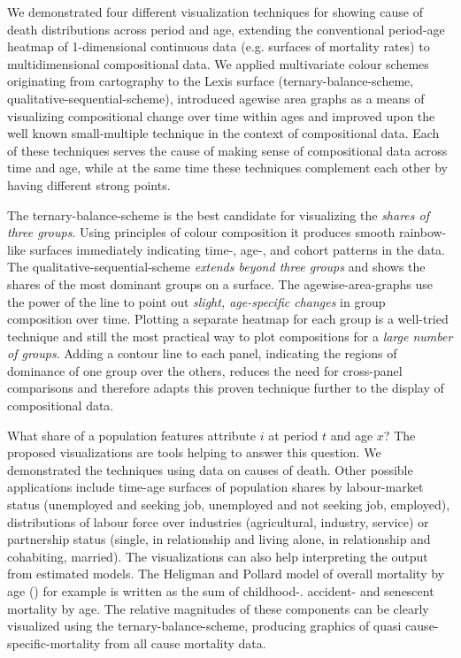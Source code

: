 \documentclass{scrartcl}
\begin{document}
We demonstrated four different visualization techniques for showing cause of death distributions across period and age, extending the conventional period-age heatmap of 1-dimensional continuous data (e.g. surfaces of mortality rates) to multidimensional compositional data. We applied multivariate colour schemes originating from cartography to the Lexis surface (ternary-balance-scheme, qualitative-sequential-scheme), introduced agewise area graphs as a means of visualizing compositional change over time within ages and improved upon the well known small-multiple technique in the context of compositional data. Each of these techniques serves the cause of making sense of compositional data across time and age, while at the same time these techniques complement each other by having different strong points.

The ternary-balance-scheme is the best candidate for visualizing the \emph{shares of three groups}. Using principles of colour composition it produces smooth rainbow-like surfaces immediately indicating time-, age-, and cohort patterns in the data. The qualitative-sequential-scheme \emph{extends beyond three groups} and shows the shares of the most dominant groups on a surface. The agewise-area-graphs use the power of the line to point out \emph{slight, age-specific changes} in group composition over time. Plotting a separate heatmap for each group is a well-tried technique and still the most practical way to plot compositions for a \emph{large number of groups}. Adding a contour line to each panel, indicating the regions of dominance of one group over the others, reduces the need for cross-panel comparisons and therefore adapts this proven technique further to the display of compositional data.

What share of a population features attribute $i$ at period $t$ and age $x$? The proposed visualizations are tools helping to answer this question. We demonstrated the techniques using data on causes of death. Other possible applications include time-age surfaces of population shares by labour-market status (unemployed and seeking job, unemployed and not seeking job, employed), distributions of labour force over industries (agricultural, industry, service) or partnership status (single, in relationship and living alone, in relationship and cohabiting, married). The visualizations can also help interpreting the output from estimated models. The Heligman and Pollard model of overall mortality by age (\cite{Heligman1980}) for example is written as the sum of childhood-. accident- and senescent mortality by age. The relative magnitudes of these components can be clearly visualized using the ternary-balance-scheme, producing graphics of quasi cause-specific-mortality from all cause mortality data.
\end{document}
